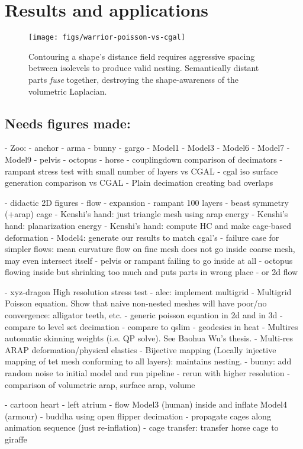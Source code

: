 
\section{Results and applications}
\label{sec:results}



\begin{figure}
\texttt{[image: figs/warrior-poisson-vs-cgal]}
\caption{Contouring a shape's distance field requires aggressive spacing
between isolevels to produce valid nesting. Semantically distant parts
\emph{fuse} together, destroying the shape-awareness of the volumetric
Laplacian.} 
\label{fig:warrior-poisson}
\end{figure}

\subsection{Needs figures made:}
- Zoo:
  - anchor
  - arma
  - bunny
  - gargo
  - Model1
  - Model3
  - Model6
  - Model7
  - Model9
  - pelvis
  - octopus
  - horse
- couplingdown comparison of decimators
- rampant stress test with small number of layers vs CGAL
- cgal iso surface generation comparison vs CGAL
- Plain decimation creating bad overlaps

- didactic 2D figures
  - flow
  - expansion
- rampant 100 layers
- beast symmetry (+arap) cage
- Kenshi's hand: just triangle mesh using arap energy
- Kenshi's hand: planarization energy 
- Kenshi's hand: compute HC and make cage-based deformation
- Model4: generate our results to match cgal's
- failure case for simpler flows: mean curvature flow on fine mesh does not
  go inside coarse mesh, may even intersect itself
    - pelvis or rampant failing to go inside at all
    - octopus flowing inside but shrinking too much and puts parts in wrong
      place
    - or 2d flow

- xyz-dragon High resolution stress test
- alec: implement multigrid
  - Multigrid Poisson equation. Show that naive non-nested meshes will have
    poor/no convergence: alligator teeth, etc.
      - generic poisson equation in 2d and in 3d
        - compare to level set decimation
        - compare to qslim
      - geodesics in heat 
  - Multires automatic skinning weights (i.e. QP solve). See Baohua Wu's thesis.
  - Multi-res ARAP deformation/physical elastics
  - Bijective mapping (Locally injective mapping of tet mesh conforming to all
    layers): maintains nesting.
- bunny: add random noise to initial model and run pipeline
  - rerun with higher resolution
- comparison of volumetric arap, surface arap, volume

- cartoon heart
- left atrium
- flow Model3 (human) inside and inflate Model4 (armour)
- buddha using open flipper decimation
- propagate cages along animation sequence (just re-inflation)
- cage transfer: transfer horse cage to giraffe

